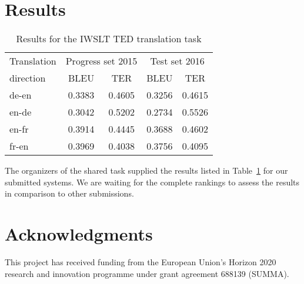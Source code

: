 \documentclass[11pt]{article}
\begin{document}
\section{Results}

\begin{table}[t]\centering
\begin{tabular}{lcccc}\toprule
 Translation & \multicolumn{2}{c}{Progress set 2015} & \multicolumn{2}{c}{Test set 2016} \\ 
 direction  & BLEU & TER & BLEU & TER \\\midrule
 de-en & 0.3383 & 0.4605 & 0.3256 & 0.4615 \\
 en-de & 0.3042 & 0.5202 & 0.2734 & 0.5526 \\
 en-fr & 0.3914 & 0.4445 & 0.3688 & 0.4602 \\
 fr-en & 0.3969 & 0.4038 & 0.3756 & 0.4095 \\ \bottomrule
\end{tabular}
\caption{Results for the IWSLT TED translation task}\label{results}
\end{table}

The organizers of the shared task supplied the results listed in Table~\ref{results} for our submitted systems. 
We are waiting for the complete rankings to assess the results in comparison to other submissions. 

\section{Acknowledgments}
This project has received funding from the European Union's Horizon 2020 research and innovation
programme under grant agreement 688139 (SUMMA).



\end{document}
